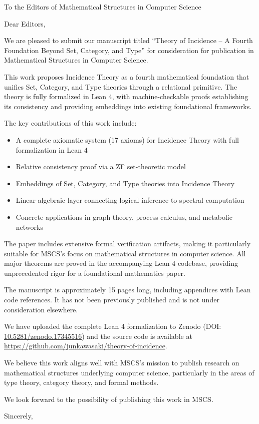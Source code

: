 \documentclass{letter}
\begin{document}
\begin{letter}{
To the Editors of Mathematical Structures in Computer Science
}

\opening{Dear Editors,}

We are pleased to submit our manuscript titled ``Theory of Incidence -- A Fourth Foundation Beyond Set, Category, and Type'' for consideration for publication in Mathematical Structures in Computer Science.

This work proposes Incidence Theory as a fourth mathematical foundation that unifies Set, Category, and Type theories through a relational primitive. The theory is fully formalized in Lean 4, with machine-checkable proofs establishing its consistency and providing embeddings into existing foundational frameworks.

The key contributions of this work include:
\begin{itemize}
\item A complete axiomatic system (17 axioms) for Incidence Theory with full formalization in Lean 4
\item Relative consistency proof via a ZF set-theoretic model
\item Embeddings of Set, Category, and Type theories into Incidence Theory
\item Linear-algebraic layer connecting logical inference to spectral computation
\item Concrete applications in graph theory, process calculus, and metabolic networks
\end{itemize}

The paper includes extensive formal verification artifacts, making it particularly suitable for MSCS's focus on mathematical structures in computer science. All major theorems are proved in the accompanying Lean 4 codebase, providing unprecedented rigor for a foundational mathematics paper.

The manuscript is approximately 15 pages long, including appendices with Lean code references. It has not been previously published and is not under consideration elsewhere.

We have uploaded the complete Lean 4 formalization to Zenodo (DOI: \href{https://doi.org/10.5281/zenodo.17345516}{10.5281/zenodo.17345516}) and the source code is available at \href{https://github.com/junkawasaki/theory-of-incidence}{https://github.com/junkawasaki/theory-of-incidence}.

We believe this work aligns well with MSCS's mission to publish research on mathematical structures underlying computer science, particularly in the areas of type theory, category theory, and formal methods.

We look forward to the possibility of publishing this work in MSCS.

\closing{Sincerely,}

\end{letter}
\end{document}
